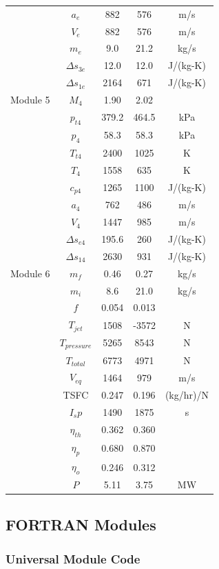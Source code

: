 \documentclass[conf]{new-aiaa} %
\begin{document}
\begin{longtable}[c]{lcccc}
    & $a_e$& 882& 576& m/s\\
    & $V_e$& 882& 576& m/s\\
    & $m_e$& 9.0& 21.2& kg/s\\
    & $\Delta s_{3e}$& 12.0& 12.0& J/(kg-K)\\
    & $\Delta s_{1e}$& 2164& 671& J/(kg-K)\\\hline
    Module 5& $M_4$& 1.90& 2.02\\
    & $p_{t4}$& 379.2& 464.5& kPa\\
    & $p_4$& 58.3& 58.3& kPa\\
    & $T_{t4}$& 2400& 1025& K\\
    & $T_4$& 1558& 635& K\\
    & $c_{p4}$& 1265& 1100& J/(kg-K)\\
    & $a_4$& 762& 486& m/s\\
    & $V_4$& 1447& 985& m/s\\
    & $\Delta s_{e4}$& 195.6& 260& J/(kg-K)\\
    & $\Delta s_{14}$& 2630& 931& J/(kg-K)\\\hline
    Module 6& $m_f$& 0.46& 0.27& kg/s\\
    & $m_i$& 8.6& 21.0& kg/s\\
    & $f$& 0.054& 0.013\\
    & $T_{jet}$& 1508& -3572& N\\
    & $T_{pressure}$& 5265& 8543& N\\
    & $T_{total}$& 6773& 4971& N\\
    & $V_{eq}$& 1464& 979& m/s\\
    & TSFC& 0.247& 0.196& (kg/hr)/N\\
    & $I_sp$& 1490& 1875& s\\
    & $\eta_{th}$& 0.362& 0.360\\
    & $\eta_p$& 0.680& 0.870\\
    & $\eta_o$& 0.246& 0.312\\
    & $P$& 5.11& 3.75& MW\\
    \hline
\end{longtable}

\subsection{FORTRAN Modules}
\subsubsection{Universal Module Code}

\end{document}
